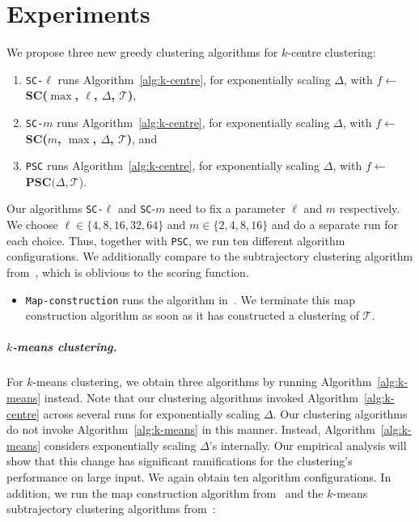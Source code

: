 \section{Experiments}
\label{sec:experiments}
%
We propose three new greedy clustering algorithms for $k$-centre clustering:
%
%
%
\begin{enumerate}
    \item \texttt{SC-}$\ell$ runs Algorithm~\ref{alg:k-centre}, for exponentially scaling $\Delta$, with $f \gets $\textbf{SC($\max$, $\ell$, $\Delta$, $\mathcal{T}$)},
    \item \texttt{SC-}$m$ runs Algorithm~\ref{alg:k-centre}, for exponentially scaling $\Delta$, with $f \gets $ \textbf{SC($m$, $\max$, $\Delta$, $\mathcal{T}$)}, and
    \item \texttt{PSC} runs Algorithm~\ref{alg:k-centre}, for exponentially scaling $\Delta$,  with $f \gets $ $\textbf{PSC}(\Delta, \mathcal{T}$).
\end{enumerate}
%
\noindent
Our algorithms \texttt{SC-}$\ell$ and \texttt{SC}-$m$ need to fix a parameter $\ell$ and $m$ respectively. 
We choose $\ell \in \{ 4, 8, 16, 32, 64 \}$ and $m \in \{ 2, 4, 8, 16 \}$ and do a separate run for each choice. 
Thus, together with \texttt{PSC}, we run ten different algorithm configurations. 
We additionally compare to the subtrajectory clustering algorithm from~\cite{buchin2020improved}, which is oblivious to the scoring function.
%
\begin{itemize}
    \item \texttt{Map-construction} runs the algorithm in~\cite{buchin2020improved}. We terminate this map construction algorithm as soon as it has constructed a clustering of $\mathcal{T}$. 
\end{itemize}
%
\subparagraph{$k$-means clustering.}
For $k$-means clustering, we obtain three algorithms by running Algorithm~\ref{alg:k-means} instead. Note that our clustering algorithms invoked Algorithm~\ref{alg:k-centre} across several runs for exponentially scaling $\Delta$. Our clustering algorithms do not invoke Algorithm~\ref{alg:k-means} in this manner. Instead, Algorithm~\ref{alg:k-means} considers exponentially scaling $\Delta$'s internally.  Our empirical analysis will show that this change has significant ramifications for the clustering's performance on large input.
%
We again obtain ten algorithm configurations. In addition, we run the map construction algorithm from~\cite{buchin2020improved} and the $k$-means subtrajectory clustering algorithms from~\cite{agarwal2018subtrajectory}:
